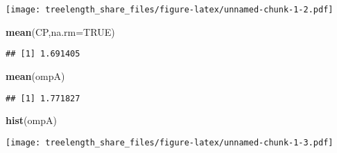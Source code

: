 \documentclass[]{article}
\newenvironment{Shaded}{\begin{snugshade}}{\end{snugshade}}
\newcommand{\DataTypeTok}[1]{\textcolor[rgb]{0.13,0.29,0.53}{#1}}
\newcommand{\KeywordTok}[1]{\textcolor[rgb]{0.13,0.29,0.53}{\textbf{#1}}}
\newcommand{\NormalTok}[1]{#1}
\newcommand{\OtherTok}[1]{\textcolor[rgb]{0.56,0.35,0.01}{#1}}
\begin{document}
\texttt{[image: treelength\_share\_files/figure-latex/unnamed-chunk-1-2.pdf]}

\begin{Shaded}
\begin{Highlighting}[]
\KeywordTok{mean}\NormalTok{(CP,}\DataTypeTok{na.rm=}\OtherTok{TRUE}\NormalTok{)}
\end{Highlighting}
\end{Shaded}

\begin{verbatim}
## [1] 1.691405
\end{verbatim}

\begin{Shaded}
\begin{Highlighting}[]
\KeywordTok{mean}\NormalTok{(ompA)}
\end{Highlighting}
\end{Shaded}

\begin{verbatim}
## [1] 1.771827
\end{verbatim}

\begin{Shaded}
\begin{Highlighting}[]
\KeywordTok{hist}\NormalTok{(ompA)}
\end{Highlighting}
\end{Shaded}

\texttt{[image: treelength\_share\_files/figure-latex/unnamed-chunk-1-3.pdf]}
\end{document}
